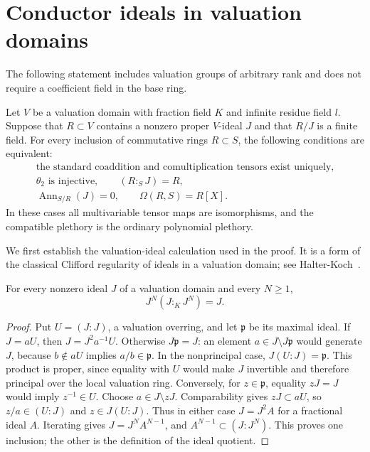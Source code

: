 
\section{Conductor ideals in valuation domains}

The following statement includes valuation groups of arbitrary rank and
does not require a coefficient field in the base ring.

\begin{theorem}\label{thm:valuation-conductor-arbitrary-coefficients}
Let $V$ be a valuation domain with fraction field $K$ and infinite
residue field $l$. Suppose that $R\subset V$ contains a nonzero proper
$V$-ideal $J$ and that $R/J$ is a finite field. For every inclusion of
commutative rings $R\subset S$, the following conditions are equivalent:
\[
\begin{gathered}
 \text{the standard coaddition and comultiplication tensors exist uniquely},\\
 \theta_2\text{ is injective},\qquad (R:_S J)=R,\\
 \operatorname{Ann}_{S/R}(J)=0,\qquad \Omega(R,S)=R[X].
\end{gathered}
\]
In these cases all multivariable tensor maps are isomorphisms, and the
compatible plethory is the ordinary polynomial plethory.
\end{theorem}

We first establish the valuation-ideal calculation used in the proof.
It is a form of the classical Clifford regularity of ideals in a
valuation domain; see Halter-Koch~\cite[Section~5, Lemmas~5.1--5.3 and
Theorem~5.4(1)]{HalterKoch2009}.

\begin{lemma}\label{lem:valuation-ideal-division}
For every nonzero ideal $J$ of a valuation domain and every $N\ge1$,
\[
                         J^N(J:_KJ^N)=J.
\]
\end{lemma}
\begin{proof}
Put $U=(J:J)$, a valuation overring, and let $\mathfrak p$ be its
maximal ideal. If $J=aU$, then $J=J^2a^{-1}U$. Otherwise
$J\mathfrak p=J$: an element $a\in J\setminus J\mathfrak p$ would
generate $J$, because $b\notin aU$ implies $a/b\in\mathfrak p$.
In the nonprincipal case, $J(U:J)=\mathfrak p$. This product is proper,
since equality with $U$ would make $J$ invertible and therefore
principal over the local valuation ring. Conversely, for
$z\in\mathfrak p$, equality $zJ=J$ would imply $z^{-1}\in U$.
Choose $a\in J\setminus zJ$. Comparability gives $zJ\subset aU$,
so $z/a\in(U:J)$ and $z\in J(U:J)$.
Thus in either case $J=J^2A$ for a fractional ideal $A$. Iterating
gives $J=J^NA^{N-1}$, and $A^{N-1}\subset(J:J^N)$. This proves one
inclusion; the other is the definition of the ideal quotient.
\end{proof}

